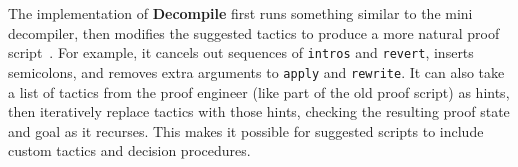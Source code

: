 The implementation of \textbf{Decompile} first runs something similar to the mini decompiler, then modifies the suggested tactics to produce a more natural proof script~\href{https://github.com/uwplse/pumpkin-pi/blob/silent/plugin/src/coq-plugin-lib/src/coq/decompiler/decompiler.ml}{}. %
For example, it cancels out sequences of \lstinline{intros} and \lstinline{revert},
inserts semicolons, and removes extra arguments to \lstinline{apply} and \lstinline{rewrite}. %
It can also take a list of tactics from the proof engineer (like part of the old proof script) as hints,
then iteratively replace tactics with those hints, checking the resulting proof state and goal as it recurses.
This makes it possible for suggested scripts to include custom tactics and decision procedures.





